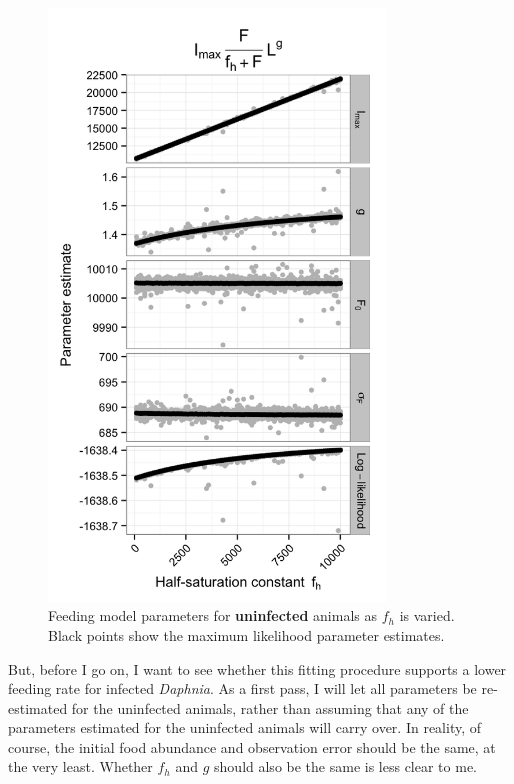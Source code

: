 \documentclass[12pt,reqno,final,pdftex]{amsart}\usepackage[]{graphicx}\usepackage[]{color}
\newenvironment{knitrout}{}{} %
\theoremstyle{plain}
\numberwithin{equation}{part}
\begin{document}
\begin{knitrout}\scriptsize
{}\color{fgcolor}\begin{figure}

\includegraphics[width=0.8\textwidth]{figure/feeding-1} \hfill{}

\caption[Feeding model parameters for \textbf{uninfected} animals as ]{Feeding model parameters for \textbf{uninfected} animals as $f_h$ is varied. Black points show the maximum likelihood parameter estimates.}\label{fig:feeding}
\end{figure}


\end{knitrout}

But, before I go on, I want to see whether this fitting procedure supports a lower feeding rate for infected \emph{Daphnia}.
As a first pass, I will let all parameters be re-estimated for the uninfected animals, rather than assuming that any of the parameters estimated for the uninfected animals will carry over.
In reality, of course, the initial food abundance and observation error should be the same, at the very least.
Whether $f_h$ and $g$ should also be the same is less clear to me.
\end{document}

